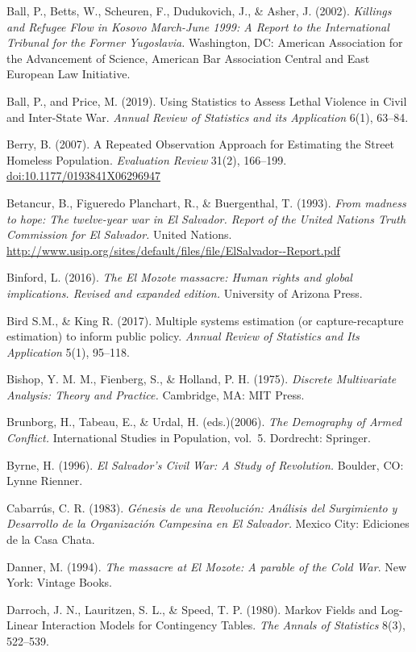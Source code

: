 \documentclass[11pt,]{article}
\begin{document}
Ball, P., Betts, W., Scheuren, F., Dudukovich, J., \& Asher, J. (2002).
\emph{Killings and Refugee Flow in Kosovo March-June 1999: A Report to
the International Tribunal for the Former Yugoslavia.} Washington, DC:
American Association for the Advancement of Science, American Bar
Association Central and East European Law Initiative.

Ball, P., and Price, M. (2019). Using Statistics to Assess Lethal
Violence in Civil and Inter-State War. \emph{Annual Review of Statistics
and its Application} 6(1), 63--84.

Berry, B. (2007). A Repeated Observation Approach for Estimating the
Street Homeless Population. \emph{Evaluation Review} 31(2), 166--199.
\url{doi:10.1177/0193841X06296947}

Betancur, B., Figueredo Planchart, R., \& Buergenthal, T. (1993).
\emph{From madness to hope: The twelve-year war in El Salvador. Report
of the United Nations Truth Commission for El Salvador.} United Nations.
\url{http://www.usip.org/sites/default/files/file/ElSalvador--Report.pdf}

Binford, L. (2016). \emph{The El Mozote massacre: Human rights and
global implications. Revised and expanded edition.} University of
Arizona Press.

Bird S.M., \& King R. (2017). Multiple systems estimation (or
capture-recapture estimation) to inform public policy. \emph{Annual
Review of Statistics and Its Application} 5(1), 95--118.

Bishop, Y. M. M., Fienberg, S., \& Holland, P. H. (1975). \emph{Discrete
Multivariate Analysis: Theory and Practice.} Cambridge, MA: MIT Press.

Brunborg, H., Tabeau, E., \& Urdal, H. (eds.)(2006). \emph{The
Demography of Armed Conflict.} International Studies in Population,
vol.~5. Dordrecht: Springer.

Byrne, H. (1996). \emph{El Salvador's Civil War: A Study of Revolution.}
Boulder, CO: Lynne Rienner.

Cabarrús, C. R. (1983). \emph{Génesis de una Revolución: Análisis del
Surgimiento y Desarrollo de la Organización Campesina en El Salvador.}
Mexico City: Ediciones de la Casa Chata.

Danner, M. (1994). \emph{The massacre at El Mozote: A parable of the
Cold War}. New York: Vintage Books.

Darroch, J. N., Lauritzen, S. L., \& Speed, T. P. (1980). Markov Fields
and Log-Linear Interaction Models for Contingency Tables. \emph{The
Annals of Statistics} 8(3), 522--539.
\end{document}
